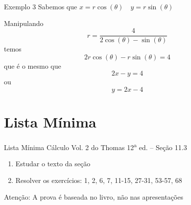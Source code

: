 \begin{frame}{Exemplo 3}
  Sabemos que
  \(
    x = r\cos(\theta) \quad
    y = r\sin(\theta)
  \)

  \pause
  Manipulando
  \[
    r = \frac{4}{2\cos(\theta)-\sin(\theta)}
  \]
  \pause
  temos
  \[
    2r\cos(\theta) - r\sin(\theta) = 4
  \]
  \pause
  que é o mesmo que
  \[
    2x - y = 4
  \]
  \pause
  ou
  \[
    y = 2x - 4
  \]
\end{frame}

\section{Lista Mínima}

\begin{frame}{Lista Mínima}
  Cálculo Vol. 2 do Thomas 12\textsuperscript{a} ed. -- Seção 11.3
  \begin{enumerate}
    \item Estudar o texto da seção
    \item Resolver os exercícios: 1, 2, 6, 7, 11-15, 27-31, 53-57, 68
  \end{enumerate}

  \vfill
  Atenção: A prova é baseada no livro, não nas apresentações
\end{frame}


